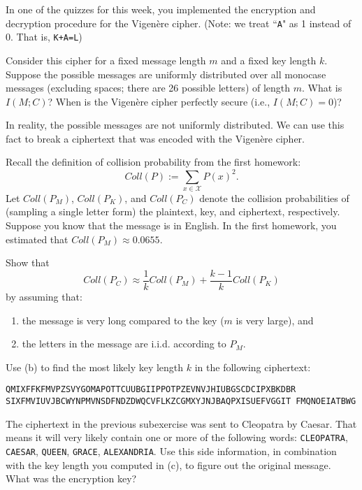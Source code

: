 \documentclass[a4paper,10pt,landscape,twocolumn]{scrartcl}
\begin{document}
\begin{exercise}[Programming (7pt)]
	In one of the quizzes for this week, you implemented the encryption and decryption procedure for the Vigen\`{e}re cipher. (Note: we treat ``\texttt{A}" as 1 instead of 0. That is, \texttt{K+A=L})
	\begin{subex}[(1pt)]
		Consider this cipher for a fixed message length $m$ and a fixed key length $k$.
		Suppose the possible messages are uniformly distributed over all monocase messages (excluding spaces; there are 26 possible letters) of length $m$. What is $I(M;C)$? When is the Vigen\`ere cipher perfectly secure (i.e., $I(M;C) = 0$)?
	\end{subex}
	In reality, the possible messages are not uniformly distributed. We can use this fact to break a ciphertext that was encoded with the Vigen\`{e}re cipher.
	
	Recall the definition of collision probability from the first homework:
	\[
	Coll(P) := \sum_{x \in \mathcal{X}} P(x)^2.
	\]
	Let $Coll(P_M)$, $Coll(P_K)$, and $Coll(P_C)$ denote the collision probabilities of (sampling a single letter form) the plaintext, key, and ciphertext, respectively. Suppose you know that the message is in English. In the first homework, you estimated that $Coll(P_M) \approx 0.0655$.
	\begin{subex}[(2pt)]
		Show that
		\[
		Coll(P_C) \approx \frac{1}{k} Coll(P_M) + \frac{k-1}{k} Coll(P_K)
		\]
		by assuming that:
		\begin{enumerate}
			\item the message is very long compared to the key ($m$ is very large), and
			\item the letters in the message are i.i.d. according to $P_M$.
		\end{enumerate}
	\end{subex}
	\begin{subex}[(2pt)]
		Use (b) to find the most likely key length $k$ in the following ciphertext:
		\begin{center}
			\texttt{QMIXFFKFMVPZSVYGOMAPOTTCUUBGIIPPOTPZEVNVJHIUBGSCDCIPXBKDBR
			SIXFMVIUVJBCWYNPMVNSDFNDZDWQCVFLKZCGMXYJNJBAQPXISUEFVGGIT
			FMQNOEIATBWG}
		\end{center}
	\end{subex}
	\begin{subex}[(2pt)]
		The ciphertext in the previous subexercise was sent to Cleopatra by Caesar. That means it will very likely contain one or more of the following words: \texttt{CLEOPATRA}, \texttt{CAESAR}, \texttt{QUEEN}, \texttt{GRACE}, \texttt{ALEXANDRIA}. Use this side information, in combination with the key length you computed in (c), to figure out the original message. What was the encryption key?
	\end{subex}
\end{exercise}
\end{document}
